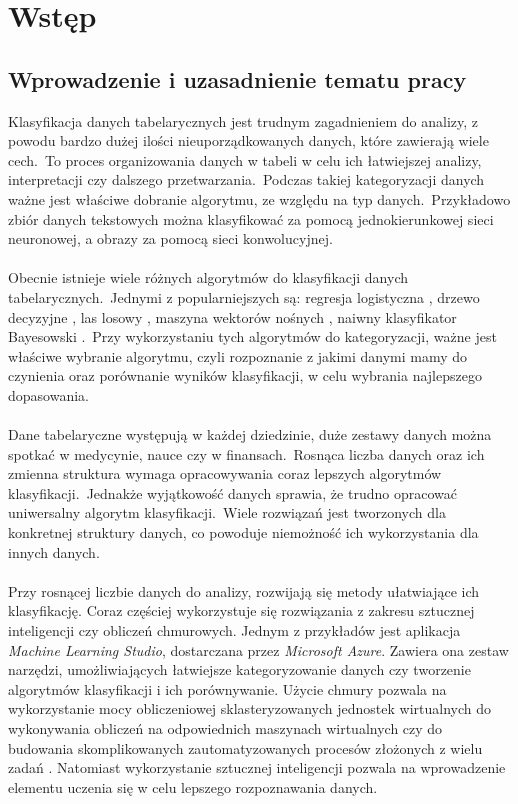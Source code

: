 \chapter{Wstęp}

\section{Wprowadzenie i uzasadnienie tematu pracy}
Klasyfikacja danych tabelarycznych jest trudnym zagadnieniem do analizy, z powodu bardzo dużej ilości nieuporządkowanych danych, które zawierają wiele cech.\ To proces organizowania danych w tabeli w celu ich łatwiejszej analizy, interpretacji czy dalszego przetwarzania.\ Podczas takiej kategoryzacji danych ważne jest właściwe dobranie algorytmu, ze względu na typ danych.\ Przykładowo zbiór danych tekstowych można klasyfikować za pomocą jednokierunkowej sieci neuronowej, a obrazy za pomocą sieci konwolucyjnej.\
\\ \\
Obecnie istnieje wiele różnych algorytmów do klasyfikacji danych tabelarycznych.\ Jednymi z popularniejszych są: regresja logistyczna , drzewo decyzyjne , las losowy , maszyna wektorów nośnych , naiwny klasyfikator Bayesowski .\ Przy wykorzystaniu tych algorytmów do kategoryzacji, ważne jest właściwe wybranie algorytmu, czyli rozpoznanie z jakimi danymi mamy do czynienia oraz porównanie wyników klasyfikacji, w celu wybrania najlepszego dopasowania.
\\ \\
Dane tabelaryczne występują w każdej dziedzinie, duże zestawy danych można spotkać w medycynie, nauce czy w finansach.\ Rosnąca liczba danych oraz ich zmienna struktura wymaga opracowywania coraz lepszych algorytmów klasyfikacji.\ Jednakże wyjątkowość danych sprawia, że trudno opracować uniwersalny algorytm klasyfikacji.\ Wiele rozwiązań jest tworzonych dla konkretnej struktury danych, co powoduje niemożność ich wykorzystania dla innych danych.
\\ \\
Przy rosnącej liczbie danych do analizy, rozwijają się metody ułatwiające ich klasyfikację. Coraz częściej wykorzystuje się rozwiązania z zakresu sztucznej inteligencji czy obliczeń chmurowych. Jednym z przykładów jest aplikacja \textit{Machine Learning Studio},  dostarczana przez \textit{Microsoft Azure}. Zawiera ona zestaw narzędzi, umożliwiających łatwiejsze kategoryzowanie danych czy tworzenie algorytmów klasyfikacji i ich porównywanie. Użycie chmury pozwala na wykorzystanie mocy obliczeniowej sklasteryzowanych jednostek wirtualnych do wykonywania obliczeń na odpowiednich maszynach wirtualnych czy do budowania skomplikowanych zautomatyzowanych procesów złożonych z wielu zadań . Natomiast wykorzystanie sztucznej inteligencji pozwala na wprowadzenie elementu uczenia się w celu lepszego rozpoznawania danych.
